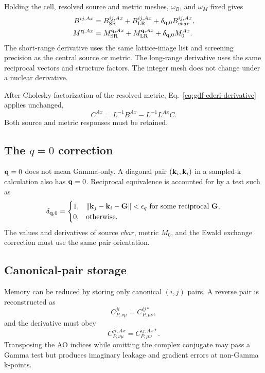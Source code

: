 Holding the cell, resolved source and metric meshes, $\omega_B$, and
$\omega_M$ fixed gives
\begin{align}
  B^{ij,Ax}
  &=B_{\mathrm{SR}}^{ij,Ax}
    +B_{\mathrm{LR}}^{ij,Ax}
    +\delta_{\mathbf{q},0}B_{vbar}^{ij,Ax},
  \label{eq:rsdf-source-derivative}\\
  M^{\mathbf{q},Ax}
  &=M_{\mathrm{SR}}^{\mathbf{q},Ax}
    +M_{\mathrm{LR}}^{\mathbf{q},Ax}
    +\delta_{\mathbf{q},0}M_0^{Ax}.
  \label{eq:rsdf-metric-derivative}
\end{align}
The short-range derivative uses the same lattice-image list and screening
precision as the central source or metric.  The long-range derivative uses the
same reciprocal vectors and structure factors.  The integer mesh does not
change under a nuclear derivative.

After Cholesky factorization of the resolved metric,
Eq.~\eqref{eq:gdf-cderi-derivative} applies unchanged,
\begin{equation}
  C^{Ax}=L^{-1}B^{Ax}-L^{-1}L^{Ax}C.
  \label{eq:rsdf-cderi-derivative}
\end{equation}
Both source and metric responses must be retained.

\subsection{The \texorpdfstring{$q=0$}{q=0} correction}

$\mathbf{q}=0$ does not mean Gamma-only.  A diagonal pair $(\mathbf{k}_i,\mathbf{k}_i)$ in a
sampled-k calculation also has $\mathbf{q}=0$.  Reciprocal equivalence is accounted
for by a test such as
\begin{equation}
  \delta_{\mathbf{q},0}
  =\begin{cases}
    1,&\|\mathbf{k}_j-\mathbf{k}_i-\mathbf{G}\|<\epsilon_q
       \ \text{for some reciprocal }\mathbf{G},\\
    0,&\text{otherwise}.
   \end{cases}
  \label{eq:rsdf-qzero-test}
\end{equation}
The values and derivatives of source $vbar$, metric $M_0$, and the Ewald
exchange correction must use the same pair orientation.

\subsection{Canonical-pair storage}

Memory can be reduced by storing only canonical $(i,j)$ pairs.  A reverse pair
is reconstructed as
\begin{equation}
  C_{P,\nu\mu}^{ji}
  =C_{P,\mu\nu}^{ij *},
  \label{eq:rsdf-reverse-pair}
\end{equation}
and the derivative must obey
\begin{equation}
  C_{P,\nu\mu}^{ji,Ax}
  =C_{P,\mu\nu}^{ij,Ax *}.
  \label{eq:rsdf-reverse-pair-derivative}
\end{equation}
Transposing the AO indices while omitting the complex conjugate may pass a
Gamma test but produces imaginary leakage and gradient errors at non-Gamma
k-points.

